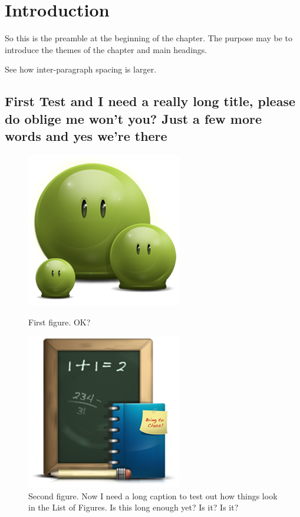 \chapter{Introduction}

So this is the preamble at the beginning of the chapter. The purpose may be to introduce the themes of the chapter and main headings.

See how inter-paragraph spacing is larger. %

\section{First Test and I need a really long title, please do oblige me won't you? Just a few more words and yes we're there}
\lipsum[1-2]

\begin{figure}[hbt!]\centering
\includegraphics[width=.3\textwidth]{green}
\caption{First figure. OK?}

\bigskip

\includegraphics[width=.3\textwidth]{school}
\caption{Second figure. Now I need a long caption to test out how things look in the List of Figures. Is this long enough yet? Is it? Is it?}
\end{figure}

\lipsum[4-5]


